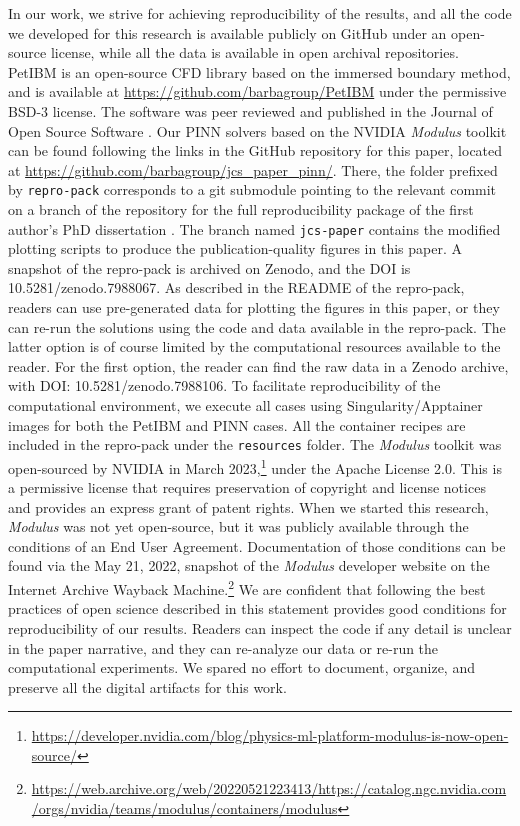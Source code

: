 
In our work, we strive for achieving reproducibility of the results, and all the code we developed for this research is available publicly on GitHub under an open-source license, while all the data is available in open archival repositories.
PetIBM is an open-source CFD library based on the immersed boundary method, and is available at \url{https://github.com/barbagroup/PetIBM} under the permissive BSD-3 license. 
The software was peer reviewed and published in the Journal of Open Source Software \cite{chuang_petibm_2018}. 
Our PINN solvers based on the NVIDIA \emph{Modulus} toolkit can be found following the links in the GitHub repository for this paper, located at \url{https://github.com/barbagroup/jcs_paper_pinn/}. 
There, the folder prefixed by \texttt{repro-pack} corresponds to a git submodule pointing to the relevant commit on a branch of the repository for the full reproducibility package of the first author's PhD dissertation \cite{chuang_thesis_2023}.
The branch named \texttt{jcs-paper} contains the modified plotting scripts to produce the publication-quality figures in this paper.    
A snapshot of the repro-pack is archived on Zenodo, and the DOI is 10.5281/zenodo.7988067.
As described in the README of the repro-pack, readers can use pre-generated data for plotting the figures in this paper, or they can re-run the solutions using the code and data available in the repro-pack.
The latter option is of course limited by the computational resources available to the reader.
For the first option, the reader can find the raw data in a Zenodo archive, with DOI: 10.5281/zenodo.7988106.
To facilitate reproducibility of the computational environment, we execute all cases using Singularity/Apptainer images for both the PetIBM and PINN cases. 
All the container recipes are included in the repro-pack under the \texttt{resources} folder. 
The \emph{Modulus} toolkit was open-sourced by NVIDIA in March 2023,\footnote{\url{https://developer.nvidia.com/blog/physics-ml-platform-modulus-is-now-open-source/}} under the Apache License 2.0.
This is a permissive license that requires preservation of copyright and license notices and provides an express grant of patent rights. 
When we started this research, \emph{Modulus} was not yet open-source, but it was publicly available through the conditions of an End User Agreement. 
Documentation of those conditions can be found via the May 21, 2022, snapshot of the \emph{Modulus} developer website on the Internet Archive Wayback Machine.\footnote{\url{https://web.archive.org/web/20220521223413/https://catalog.ngc.nvidia.com/orgs/nvidia/teams/modulus/containers/modulus}}
We are confident that following the best practices of open science described in this statement provides good conditions for reproducibility of our results. 
Readers can inspect the code if any detail is unclear in the paper narrative, and they can re-analyze our data or re-run the computational experiments.
We spared no effort to document, organize, and preserve all the digital artifacts for this work.
